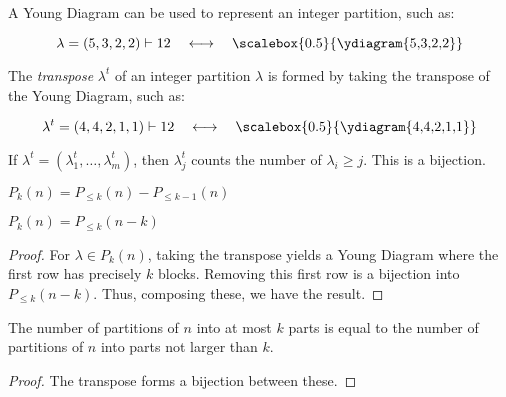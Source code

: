 \documentclass[a4paper]{article}
\begin{document}
\begin{concept}
A Young Diagram can be used to represent an integer partition, such as:

\begin{equation*}
\lambda=(5,3,2,2)\vdash 12\quad \longleftrightarrow\quad\vcenter{\hbox{\scalebox{0.5}{\ydiagram{5,3,2,2}}}}
\end{equation*}
\end{concept}

\begin{definition}
The \emph{transpose} $\lambda^t$ of an integer partition $\lambda$ is formed by taking the transpose of the Young Diagram, such as:

\begin{equation*}
\lambda^t=(4,4,2,1,1)\vdash 12\quad \longleftrightarrow\quad\vcenter{\hbox{\scalebox{0.5}{\ydiagram{4,4,2,1,1}}}}
\end{equation*}

If $\lambda^t=(\lambda^t_1,\dots,\lambda_m^t)$, then $\lambda_j^t$ counts the number of $\lambda_i\geq j$. This is a bijection.
\end{definition}

\begin{proposition}
$P_k(n)=P_{\leq k}(n)-P_{\leq k-1}(n)$
\end{proposition}

\begin{theorem}
$P_k(n)=P_{\leq k}(n-k)$

\begin{hl}
\begin{proof}
For $\lambda\in P_k(n)$, taking the transpose yields a Young Diagram where the first row has precisely $k$ blocks. Removing this first row is a bijection into $P_{\leq k}(n-k)$. Thus, composing these, we have the result.
\end{proof}
\end{hl}
\end{theorem}

\begin{theorem}
The number of partitions of $n$ into at most $k$ parts is equal to the number of partitions of $n$ into parts not larger than $k$.

\begin{hl}
\begin{proof}
The transpose forms a bijection between these.
\end{proof}
\end{hl}
\end{theorem}
\end{document}
